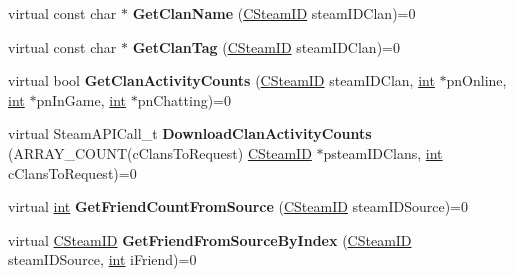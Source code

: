 \begin{DoxyCompactItemize}
\item 
\hypertarget{classISteamFriends_a2562ee2c900eb411257ad744d2829843}{}virtual const char $\ast$ {\bfseries Get\+Clan\+Name} (\hyperlink{classCSteamID}{C\+Steam\+I\+D} steam\+I\+D\+Clan)=0\label{classISteamFriends_a2562ee2c900eb411257ad744d2829843}

\item 
\hypertarget{classISteamFriends_ad5457bd8e8bb800347e9d98691bc5ea9}{}virtual const char $\ast$ {\bfseries Get\+Clan\+Tag} (\hyperlink{classCSteamID}{C\+Steam\+I\+D} steam\+I\+D\+Clan)=0\label{classISteamFriends_ad5457bd8e8bb800347e9d98691bc5ea9}

\item 
\hypertarget{classISteamFriends_a9c1140ebd30409abe8eb2d396c41a08b}{}virtual bool {\bfseries Get\+Clan\+Activity\+Counts} (\hyperlink{classCSteamID}{C\+Steam\+I\+D} steam\+I\+D\+Clan, \hyperlink{SDL__thread_8h_a6a64f9be4433e4de6e2f2f548cf3c08e}{int} $\ast$pn\+Online, \hyperlink{SDL__thread_8h_a6a64f9be4433e4de6e2f2f548cf3c08e}{int} $\ast$pn\+In\+Game, \hyperlink{SDL__thread_8h_a6a64f9be4433e4de6e2f2f548cf3c08e}{int} $\ast$pn\+Chatting)=0\label{classISteamFriends_a9c1140ebd30409abe8eb2d396c41a08b}

\item 
\hypertarget{classISteamFriends_a2b708e391d8eb233790482892a4b2558}{}virtual Steam\+A\+P\+I\+Call\+\_\+t {\bfseries Download\+Clan\+Activity\+Counts} (A\+R\+R\+A\+Y\+\_\+\+C\+O\+U\+N\+T(c\+Clans\+To\+Request) \hyperlink{classCSteamID}{C\+Steam\+I\+D} $\ast$psteam\+I\+D\+Clans, \hyperlink{SDL__thread_8h_a6a64f9be4433e4de6e2f2f548cf3c08e}{int} c\+Clans\+To\+Request)=0\label{classISteamFriends_a2b708e391d8eb233790482892a4b2558}

\item 
\hypertarget{classISteamFriends_affdd9c69c64cd4725d86ff591a1cd8b4}{}virtual \hyperlink{SDL__thread_8h_a6a64f9be4433e4de6e2f2f548cf3c08e}{int} {\bfseries Get\+Friend\+Count\+From\+Source} (\hyperlink{classCSteamID}{C\+Steam\+I\+D} steam\+I\+D\+Source)=0\label{classISteamFriends_affdd9c69c64cd4725d86ff591a1cd8b4}

\item 
\hypertarget{classISteamFriends_a0fd81e3ab7aa52018dfce8ccdd5c611a}{}virtual \hyperlink{classCSteamID}{C\+Steam\+I\+D} {\bfseries Get\+Friend\+From\+Source\+By\+Index} (\hyperlink{classCSteamID}{C\+Steam\+I\+D} steam\+I\+D\+Source, \hyperlink{SDL__thread_8h_a6a64f9be4433e4de6e2f2f548cf3c08e}{int} i\+Friend)=0\label{classISteamFriends_a0fd81e3ab7aa52018dfce8ccdd5c611a}


\end{DoxyCompactItemize}

